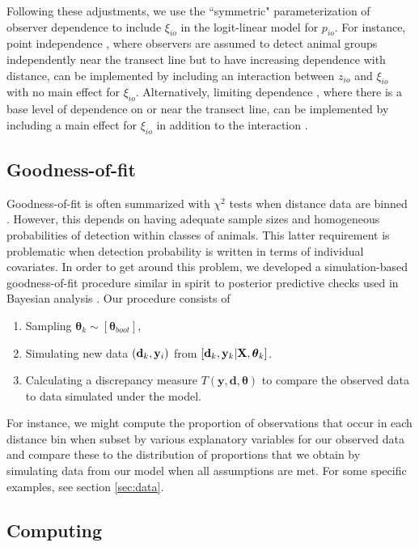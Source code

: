 \documentclass[aoas,preprint]{imsart}
\numberwithin{equation}{section}
\theoremstyle{plain}
\begin{document}
Following these adjustments, we use the ``symmetric" parameterization \citep{MacKenzieClement2016} of observer dependence to include $\xi_{io}$ in the logit-linear model for $p_{io}$.  For instance, point independence \citep{LaakeBorchers2004,BucklandEtAl2010}, where observers are assumed to detect animal groups independently near the transect line but to have increasing dependence with distance, can be implemented by including an interaction between $z_{io}$ and $\xi_{io}$ with no main effect for $\xi_{io}$.  Alternatively, limiting dependence \citep{BucklandEtAl2010}, where there is a base level of dependence on or near the transect line, can be implemented by including a main effect for $\xi_{io}$ in addition to the interaction \citep{MacKenzieClement2016}.

\subsection{Goodness-of-fit}

Goodness-of-fit is often summarized with $\chi^2$ tests when distance data are binned \citep{BurnhamEtAl2004}.  However, this depends on having adequate sample sizes and homogeneous probabilities of detection within classes of animals. This latter requirement is problematic when detection probability is written in terms of individual covariates.  In order to get around this problem, we developed a simulation-based goodness-of-fit procedure similar in spirit to posterior predictive checks used in Bayesian analysis \citep[e.g.][]{GelmanEtAl2014}.  Our procedure consists of
\begin{enumerate}
  \item Sampling $\boldsymbol{\theta}_k \sim [\boldsymbol{\theta}_{boot}]$,
  \item Simulating new data $({\bf d}_k, {\bf y}_i)$ from $[{\bf d}_k,{\bf y}_k | {\bf X},\boldsymbol{\theta}_k]$.
  \item Calculating a discrepancy measure $T(\textbf{y},\textbf{d},\boldsymbol{\theta})$ to compare the observed data to data simulated under the model.
\end{enumerate}
For instance, we might compute the proportion of observations that occur in each distance bin when subset by various explanatory variables for our observed data and compare these to the distribution of proportions that we obtain by simulating data from our model when all assumptions are met.  For some specific examples, see section \ref{sec:data}.

\subsection{Computing}
\end{document}
